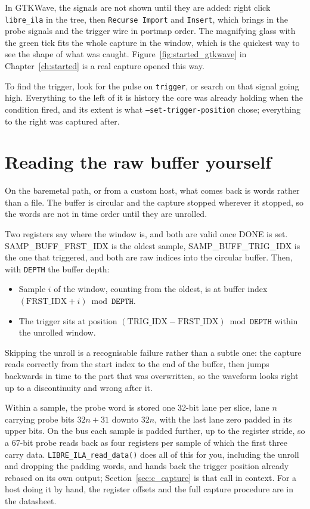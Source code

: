 \documentclass[../manual.tex]{subfiles}
\begin{document}
In GTKWave, the signals are not shown until they are added: right click \texttt{libre\_ila} in the tree, then \texttt{Recurse Import} and \texttt{Insert}, which brings in the probe signals and the trigger wire in portmap order. The magnifying glass with the green tick fits the whole capture in the window, which is the quickest way to see the shape of what was caught. Figure~\ref{fig:started_gtkwave} in Chapter~\ref{ch:started} is a real capture opened this way.

To find the trigger, look for the pulse on \texttt{trigger}, or search on that signal going high. Everything to the left of it is history the core was already holding when the condition fired, and its extent is what \texttt{--set-trigger-position} chose; everything to the right was captured after.

\section{Reading the raw buffer yourself}
\label{sec:read_raw}

On the baremetal path, or from a custom host, what comes back is words rather than a file. The buffer is circular and the capture stopped wherever it stopped, so the words are not in time order until they are unrolled.

Two registers say where the window is, and both are valid once DONE is set. SAMP\_BUFF\_FRST\_IDX is the oldest sample, SAMP\_BUFF\_TRIG\_IDX is the one that triggered, and both are raw indices into the circular buffer. Then, with \texttt{DEPTH} the buffer depth:

\begin{itemize}
    \item Sample $i$ of the window, counting from the oldest, is at buffer index $(\mathrm{FRST\_IDX} + i) \bmod \mathtt{DEPTH}$.
    \item The trigger sits at position $(\mathrm{TRIG\_IDX} - \mathrm{FRST\_IDX}) \bmod \mathtt{DEPTH}$ within the unrolled window.
\end{itemize}

Skipping the unroll is a recognisable failure rather than a subtle one: the capture reads correctly from the start index to the end of the buffer, then jumps backwards in time to the part that was overwritten, so the waveform looks right up to a discontinuity and wrong after it.

Within a sample, the probe word is stored one 32-bit lane per slice, lane $n$ carrying probe bits $32n+31$ downto $32n$, with the last lane zero padded in its upper bits. On the bus each sample is padded further, up to the register stride, so a 67-bit probe reads back as four registers per sample of which the first three carry data. \texttt{LIBRE\_ILA\_read\_data()} does all of this for you, including the unroll and dropping the padding words, and hands back the trigger position already rebased on its own output; Section~\ref{sec:c_capture} is that call in context. For a host doing it by hand, the register offsets and the full capture procedure are in the datasheet.
\end{document}
